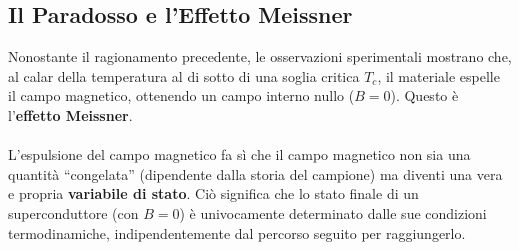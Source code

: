 \subsection*{Il Paradosso e l'Effetto Meissner}
Nonostante il ragionamento precedente, le osservazioni sperimentali mostrano che, al calar della temperatura al di sotto di una soglia critica \(T_c\), il materiale espelle il campo magnetico, ottenendo un campo interno nullo (\(B = 0\)). Questo è l'\textbf{effetto Meissner}.\\\\
L'espulsione del campo magnetico fa sì che il campo magnetico non sia una quantità “congelata” (dipendente dalla storia del campione) ma diventi una vera e propria \textbf{variabile di stato}. Ciò significa che lo stato finale di un superconduttore (con \(B = 0\)) è univocamente determinato dalle sue condizioni termodinamiche, indipendentemente dal percorso seguito per raggiungerlo.
